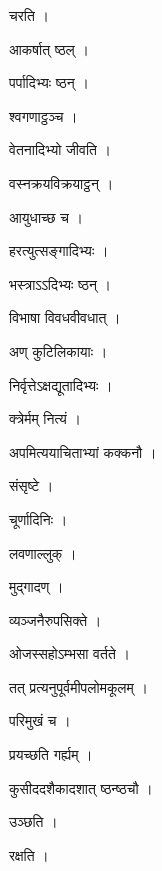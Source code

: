 \documentclass[10pt, openany]{book}
\begin{document}
\noindent चरति ।

\noindent आकर्षात् ष्ठल् ।

\noindent पर्पादिभ्यः ष्ठन् ।

\noindent श्वगणाट्ठञ्च ।

\noindent वेतनादिभ्यो जीवति ।

\noindent वस्नक्रयविक्रयाट्ठन् ।

\noindent आयुधाच्छ च ।

\noindent हरत्युत्सङ्गादिभ्यः ।

\noindent भस्त्राऽऽदिभ्यः ष्ठन् ।

\noindent विभाषा विवधवीवधात् ।

\noindent अण् कुटिलिकायाः ।

\noindent निर्वृत्तेऽक्षद्यूतादिभ्यः ।

\noindent क्त्रेर्मम् नित्यं ।

\noindent अपमित्ययाचिताभ्यां कक्कनौ ।

\noindent संसृष्टे ।

\noindent चूर्णादिनिः ।

\noindent लवणाल्लुक् ।

\noindent मुद्गादण् ।

\noindent व्यञ्जनैरुपसिक्ते ।

\noindent ओजस्सहोऽम्भसा वर्तते ।

\noindent तत् प्रत्यनुपूर्वमीपलोमकूलम् ।

\noindent परिमुखं च ।

\noindent प्रयच्छति गर्ह्यम् ।

\noindent कुसीददशैकादशात् ष्ठन्ष्ठचौ ।

\noindent उञ्छति ।

\noindent रक्षति ।
\end{document}
